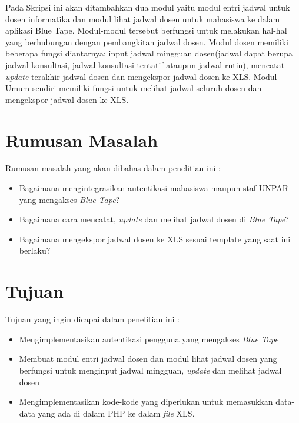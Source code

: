 
Pada Skripsi ini akan ditambahkan dua modul yaitu modul entri jadwal untuk dosen informatika dan modul lihat jadwal dosen untuk mahasiswa ke dalam aplikasi Blue Tape. Modul-modul tersebut berfungsi untuk melakukan hal-hal yang berhubungan dengan pembangkitan jadwal dosen. Modul dosen memiliki beberapa fungsi diantarnya: input jadwal mingguan dosen(jadwal dapat berupa jadwal konsultasi, jadwal konsultasi tentatif ataupun jadwal rutin), mencatat \textit{update} terakhir jadwal dosen dan mengekspor jadwal dosen ke XLS. Modul Umum sendiri memiliki fungsi untuk melihat jadwal seluruh dosen dan mengekspor jadwal dosen ke XLS.


\section{Rumusan Masalah}
\label{sec:rumusan}
Rumusan masalah yang akan dibahas dalam penelitian ini :
	\begin{itemize}
		\item Bagaimana mengintegrasikan autentikasi mahasiswa maupun staf UNPAR yang mengakses \textit{Blue Tape}?
		\item Bagaimana cara mencatat, \textit{update} dan melihat jadwal dosen di \textit{Blue Tape}?
		\item Bagaimana mengekspor jadwal dosen ke XLS sesuai template yang saat ini berlaku?
	\end{itemize}


\section{Tujuan}
\label{sec:tujuan}
Tujuan yang ingin dicapai dalam penelitian ini : 
	\begin{itemize}
		\item Mengimplementasikan autentikasi pengguna yang mengakses \textit{Blue Tape}
		\item Membuat modul entri jadwal dosen dan modul lihat jadwal dosen yang berfungsi untuk menginput jadwal mingguan, \textit{update} dan melihat jadwal dosen
		\item Mengimplementasikan kode-kode yang diperlukan untuk memasukkan data-data yang ada di dalam PHP ke dalam \textit{file} XLS. 

	\end{itemize}

